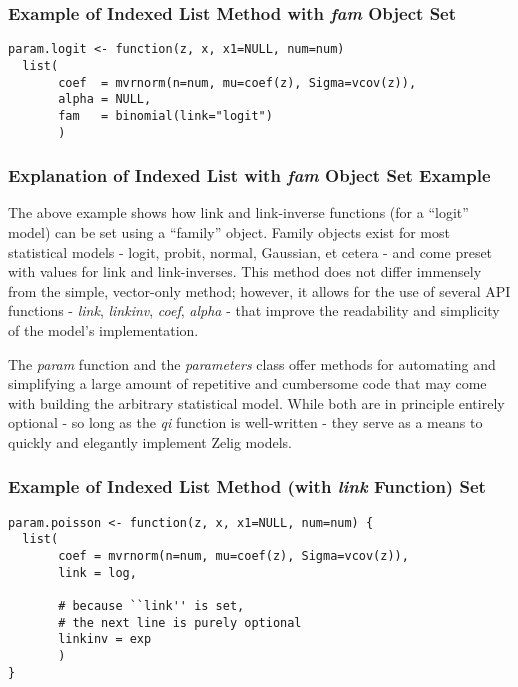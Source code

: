 \subsubsection{Example of Indexed List Method with \emph{fam} Object Set}

\begin{verbatim}
param.logit <- function(z, x, x1=NULL, num=num)
  list(
       coef  = mvrnorm(n=num, mu=coef(z), Sigma=vcov(z)),
       alpha = NULL,
       fam   = binomial(link="logit")
       )
\end{verbatim}


\subsubsection{Explanation of Indexed List with \emph{fam} Object Set Example}

The above example shows how link and link-inverse functions (for a ``logit'' model) can be set using a ``family'' object.  Family objects exist for most statistical models - logit, probit, normal, Gaussian, et cetera - and come preset with values for link and link-inverses.  This method does not differ immensely from the simple, vector-only method; however, it allows for the use of several API functions - \emph{link}, \emph{linkinv}, \emph{coef}, \emph{alpha} - that improve the readability and simplicity of the model's implementation.

The \emph{param} function and the \emph{parameters} class offer methods for automating and simplifying a large amount of repetitive and cumbersome code that may come with building the arbitrary statistical model.  While both are in principle entirely optional - so long as the \emph{qi} function is well-written - they serve as a means to quickly and elegantly implement Zelig models.


\subsubsection{Example of Indexed List Method (with \emph{link} Function) Set}

\begin{verbatim}
param.poisson <- function(z, x, x1=NULL, num=num) {
  list(
       coef = mvrnorm(n=num, mu=coef(z), Sigma=vcov(z)),
       link = log,
             
       # because ``link'' is set,
       # the next line is purely optional
       linkinv = exp
       )
}
\end{verbatim}

